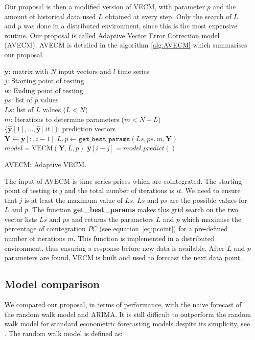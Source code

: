 Our proposal is then a modified version of VECM, with parameter $p$ and the
amount of historical data used $L$ obtained at every step. Only the search of
$L$ and $p$ was done in a distributed environment, since this is the most
expensive routine. Our proposal is called Adaptive Vector Error Correction model
(AVECM). AVECM is detailed in the algorithm \ref{alg:AVECM} which summarises
our proposal.

\begin{algorithm}[ht!]
\begin{algorithmic}[1]
\REQUIRE $\,$ \\
$\mathbf{y}$: matrix with $N$ input vectors and $l$ time series\\
$j$: Starting point of testing \\
$it$: Ending point of testing \\
$ps$: list of $p$ values \\
$Ls$: list of $L$ values ($L<N$) \\
$m$: Iterations to determine parameters ($m < N-L$)\\
\ENSURE  $\,$ \\
$\{ \hat{\mathbf{y}}[1],\dots,\hat{\mathbf{y}}[it]\}$: prediction vectors \\
   \STATE $\mathbf{Y} \gets \mathbf{y}[:,i-1]$
    \STATE $L,p \gets
    \texttt{get\_best\_params}(Ls,ps,m,\mathbf{Y})$
        \STATE $model = \text{VECM}(\mathbf{Y},L, p)$
        \STATE $\hat{\mathbf{y}}[i-j] = model.predict()$
\ENDFOR
\end{algorithmic}
\caption{AVECM: Adaptive VECM.}
\label{alg:AVECM}
\end{algorithm}

The input of AVECM is time series prices which are cointegrated. The starting
point of testing is $j$ and the total number of iterations is $it$. We need to
ensure that $j$ is at least the maximum value of $Ls$. $Ls$ and $ps$ are the
possible values for $L$ and $p$.  The function {\bf get\_best\_params} makes
this grid search on the two vector lists $Ls$ and $ps$ and returns the
parameters $L$ and $p$ which maximise the percentage of cointegration $PC$ (see
equation~\ref{eq:pcoint}) for a pre-defined number of iterations $m$. This
function is implemented in a distributed environment, thus ensuring a response
before new data is available.  After $L$ and $p$ parameters are found, VECM is
built and used to forecast the next data point.


\subsection{Model comparison} \label{sec:random}
We compared our proposal, in terms of performance, with the naive forecast of
the random walk model and ARIMA. It is still difficult to outperform the random
walk model for standard econometric forecasting models  despite its
simplicity, see \cite{lo2011}. The random walk model is defined as:

